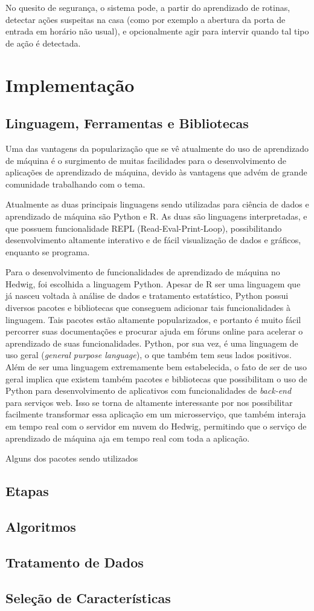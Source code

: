 		No quesito de segurança, o sistema pode, a partir do aprendizado de rotinas, detectar ações suspeitas na casa (como por exemplo a abertura da porta de entrada em horário não usual), e opcionalmente agir para intervir quando tal tipo de ação é detectada.


	\section{Implementação}

		\subsection{Linguagem, Ferramentas e Bibliotecas}

			Uma das vantagens da popularização que se vê atualmente do uso de aprendizado de máquina é o surgimento de muitas facilidades para o desenvolvimento de aplicações de aprendizado de máquina, devido às vantagens que advém de grande comunidade trabalhando com o tema.

			Atualmente as duas principais linguagens sendo utilizadas para ciência de dados e aprendizado de máquina são Python e R. As duas são linguagens interpretadas, e que possuem funcionalidade REPL (Read-Eval-Print-Loop), possibilitando desenvolvimento altamente interativo e de fácil visualização de dados e gráficos, enquanto se programa.

			Para o desenvolvimento de funcionalidades de aprendizado de máquina no Hedwig, foi escolhida a linguagem Python. Apesar de R ser uma linguagem que já nasceu voltada à análise de dados e tratamento estatístico, Python possui diversos pacotes e bibliotecas que conseguem adicionar tais funcionalidades à linguagem. Tais pacotes estão altamente popularizados, e portanto é muito fácil percorrer suas documentações e procurar ajuda em fóruns online para acelerar o aprendizado de suas funcionalidades. Python, por sua vez, é uma linguagem de uso geral (\emph{general purpose language}), o que também tem seus lados positivos. Além de ser uma linguagem extremamente bem estabelecida, o fato de ser de uso geral implica que existem também pacotes e bibliotecas que possibilitam o uso de Python para desenvolvimento de aplicativos com funcionalidades de \emph{back-end} para serviços web. Isso se torna de altamente interessante por nos possibilitar facilmente transformar essa aplicação em um microsserviço, que também interaja em tempo real com o servidor em nuvem do Hedwig, permitindo que o serviço de aprendizado de máquina aja em tempo real com toda a aplicação.

			Alguns dos pacotes sendo utilizados

		\subsection{Etapas}
		\subsection{Algoritmos}
		\subsection{Tratamento de Dados}
		\subsection{Seleção de Características}
